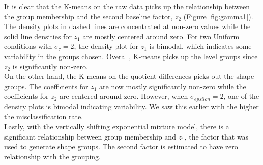 It is clear that the K-means on the raw data picks up the relationship between the group membership and the second baseline factor, $z_{2}$ (Figure \ref{fig:gamma1}). The density plots in dashed lines are concentrated at non-zero values while the solid line densities for $z_{1}$ are mostly centered around zero. For two Uniform conditions with $\sigma_{\tau}=2$, the density plot for $z_{1}$ is bimodal, which indicates some variability in the groups chosen. Overall, K-means picks up the level groups since $z_{2}$ is significantly non-zero.\\

On the other hand, the K-means on the quotient differences picks out the shape groups. The coefficients for $z_{1}$ are now mostly significantly non-zero while the coefficients for $z_{2}$ are centered around zero. However, when $\sigma_{epsilon}=2$, one of the density plots is bimodal indicating variability. We saw this earlier with the higher the misclassification rate.\\

Lastly, with the vertically shifting exponential mixture model, there is a significant relationship between group membership and $z_{1}$, the factor that was used to generate shape groups. The second factor is estimated to have zero relationship with the grouping.

